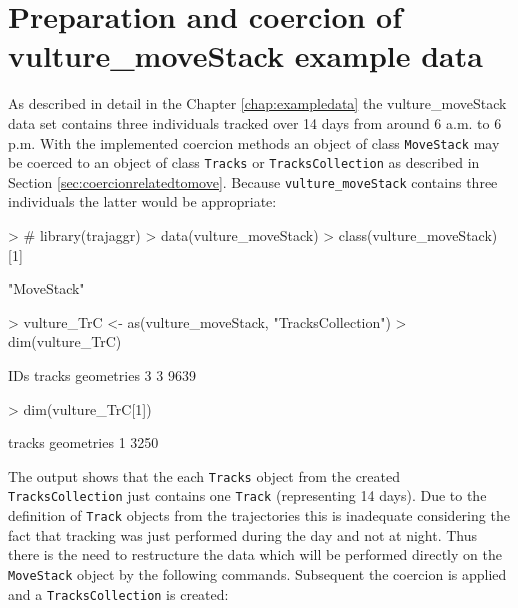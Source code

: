 \documentclass[12pt, oneside, a4paper]{scrbook}
\newcommand{\pkg}[1]{{\normalfont\fontseries{b}\selectfont #1}}
\let\code=\texttt
\begin{document}
\section{Preparation and coercion of vulture\_moveStack example data}
\label{sec:prepvulturemovestackforcount}

As described in detail in the Chapter \ref{chap:exampledata} the vulture\_moveStack data set contains three individuals tracked over 14 days from around 6 a.m. to 6 p.m. With the implemented coercion methods an object of class \code{MoveStack} may be coerced to an object of class \code{Tracks} or \code{TracksCollection} as described in Section \ref{sec:coercionrelatedtomove}. Because \code{vulture\_moveStack} contains three individuals the latter would be appropriate:
\par\medskip

\begin{small}
\begin{Schunk}
\begin{Sinput}
> # library(trajaggr)
> data(vulture_moveStack)
> class(vulture_moveStack)[1]
\end{Sinput}
\begin{Soutput}
[1] "MoveStack"
\end{Soutput}
\begin{Sinput}
> vulture_TrC <- as(vulture_moveStack, "TracksCollection")
> dim(vulture_TrC)
\end{Sinput}
\begin{Soutput}
       IDs     tracks geometries 
         3          3       9639 
\end{Soutput}
\begin{Sinput}
> dim(vulture_TrC[1])
\end{Sinput}
\begin{Soutput}
    tracks geometries 
         1       3250 
\end{Soutput}
\end{Schunk}
\end{small}
\par\medskip

The output shows that the each \code{Tracks} object from the created \code{TracksCollection} just contains  one \code{Track} (representing 14 days). Due to the definition of \code{Track} objects from the \pkg{trajectories} this is inadequate considering the fact that tracking was just performed during the day and not at night. Thus there is the need to restructure the data which will be performed directly on the \code{MoveStack} object by the following commands. Subsequent the coercion is applied and a \code{TracksCollection} is created:
\par\medskip
\end{document}
